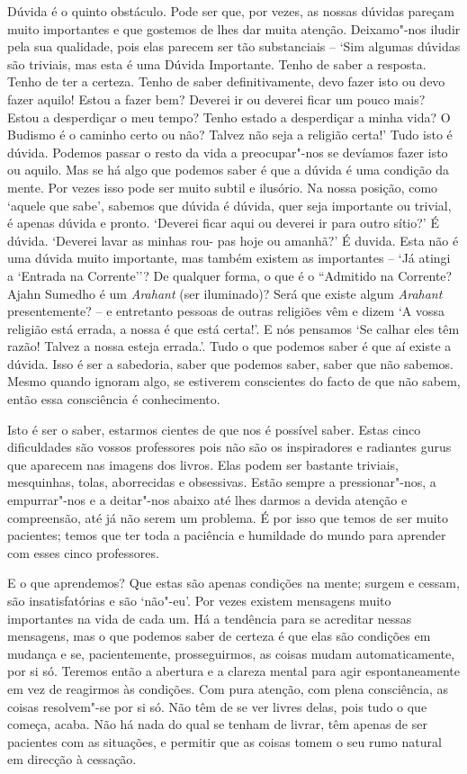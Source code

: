Dúvida é o quinto obstáculo. Pode ser que, por vezes, as nossas dúvidas
pareçam muito importantes e que gostemos de lhes dar muita atenção.
Deixamo"-nos iludir pela sua qualidade, pois elas parecem ser tão
substanciais -- `Sim algumas dúvidas são triviais, mas esta é uma Dúvida
Importante. Tenho de saber a resposta. Tenho de ter a certeza. Tenho de
saber definitivamente, devo fazer isto ou devo fazer aquilo! Estou a
fazer bem? Deverei ir ou deverei ficar um pouco mais? Estou a
desperdiçar o meu tempo? Tenho estado a desperdiçar a minha vida? O
Budismo é o caminho certo ou não? Talvez não seja a religião certa!'
Tudo isto é dúvida. Podemos passar o resto da vida a preocupar"-nos se
devíamos fazer isto ou aquilo. Mas se há algo que podemos
saber é que a dúvida é uma condição da mente. Por vezes isso
pode ser muito subtil e ilusório. Na nossa posição, como `aquele que
sabe', sabemos que dúvida é dúvida, quer seja importante ou trivial, é
apenas dúvida e pronto. `Deverei ficar aqui ou deverei ir para outro
sítio?' É dúvida. `Deverei lavar as minhas rou- pas hoje ou amanhã?' É
duvida. Esta não é uma dúvida muito importante, mas também existem as
importantes -- `Já atingi a `Entrada na Corrente''? De qualquer forma, o
que é o ``Admitido na Corrente? Ajahn Sumedho é um \emph{Arahant} (ser
iluminado)? Será que existe algum \emph{Arahant} presentemente? -- e
entretanto pessoas de outras religiões vêm e dizem `A vossa religião
está errada, a nossa é que está certa!'. E nós pensamos `Se calhar eles
têm razão! Talvez a nossa esteja errada.'. Tudo o que podemos saber é
que aí existe a dúvida. Isso é ser a sabedoria, saber que podemos saber,
saber que não sabemos. Mesmo quando ignoram algo, se estiverem
conscientes do facto de que não sabem, então essa consciência é
conhecimento.

Isto é ser o saber, estarmos cientes de que nos é possível saber. Estas
cinco dificuldades são vossos professores pois não são os inspiradores e
radiantes gurus que aparecem nas imagens dos livros. Elas podem ser
bastante triviais, mesquinhas, tolas, aborrecidas e obsessivas. Estão
sempre a pressionar"-nos, a empurrar"-nos e a deitar"-nos abaixo até lhes
darmos a devida atenção e compreensão, até já não serem um problema. É
por isso que temos de ser muito pacientes; temos que ter toda a
paciência e humildade do mundo para aprender com esses cinco
professores.

E o que aprendemos? Que estas são apenas condições na mente; surgem e
cessam, são insatisfatórias e são `não"-eu'. Por vezes existem mensagens
muito importantes na vida de cada um. Há a tendência para se acreditar
nessas mensagens, mas o que podemos saber de certeza é que elas são
condições em mudança e se, pacientemente, prosseguirmos, as coisas mudam
automaticamente, por si só. Teremos então a abertura e a clareza mental
para agir espontaneamente em vez de reagirmos às condições. Com pura
atenção, com plena consciência, as coisas resolvem"-se por si só. Não têm
de se ver livres delas, pois tudo o que começa, acaba. Não há nada do
qual se tenham de livrar, têm apenas de ser pacientes com as situações,
e permitir que as coisas tomem o seu rumo natural em direcção à
cessação.

